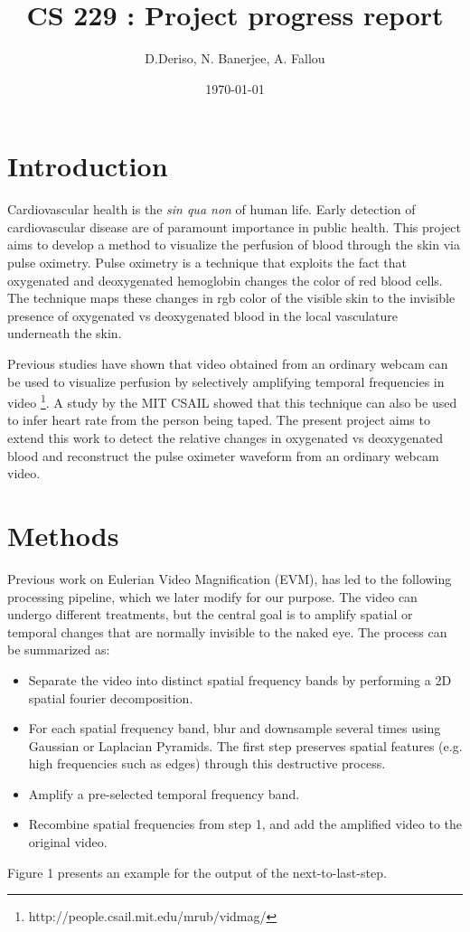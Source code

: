 \documentclass[12pt]{article}
\begin{document}
  \title{CS 229 : Project progress report}
  \author{D.Deriso, N. Banerjee, A. Fallou}
  \date{\today}
  \maketitle
  \thispagestyle{empty}



\section*{Introduction}
%
\small  
Cardiovascular health is the \emph{sin qua non} of human life. Early detection of cardiovascular disease are of paramount importance in public health. This project aims to develop a method to visualize the perfusion of blood through the skin via pulse oximetry. Pulse oximetry is a technique that exploits the fact that oxygenated and deoxygenated hemoglobin changes the color of red blood cells. The technique maps these changes in rgb color of the visible skin to the invisible presence of oxygenated vs deoxygenated blood in the local vasculature underneath the skin.

Previous studies have shown that video obtained from an ordinary webcam can be used to visualize perfusion by selectively amplifying temporal frequencies in video \footnote{http://people.csail.mit.edu/mrub/vidmag/}. A study by the MIT CSAIL showed that this technique can also be used to infer heart rate from the person being taped. The present project aims to extend this work to detect the relative changes in oxygenated vs deoxygenated blood and reconstruct the pulse oximeter waveform from an ordinary webcam video.



\section{Methods}

Previous work on Eulerian Video Magnification (EVM), has led to the following processing pipeline, which we later modify for our purpose. The video can undergo different treatments, but the central goal is to amplify spatial or temporal changes that are normally invisible to the naked eye. The process can be summarized as:

\begin{itemize}
\item Separate the video into distinct spatial frequency bands by performing a 2D spatial fourier decomposition. 
\item For each spatial frequency band, blur and downsample several times using Gaussian or Laplacian Pyramids. The first step preserves spatial features (e.g. high frequencies such as edges) through this destructive process.
\item Amplify a pre-selected temporal frequency band.
\item Recombine spatial frequencies from step 1, and add the amplified video to the original video.
\end{itemize}
Figure 1 presents an example for the output of the next-to-last-step. 
\end{document}
